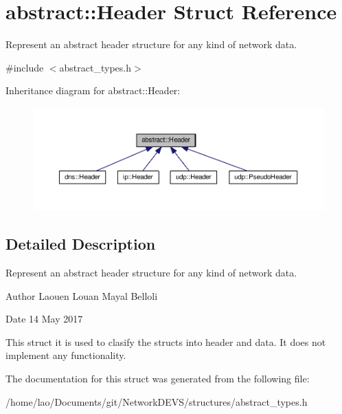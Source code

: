 \hypertarget{structabstract_1_1Header}{}\section{abstract\+:\+:Header Struct Reference}
\label{structabstract_1_1Header}


Represent an abstract header structure for any kind of network data.  




{\ttfamily \#include $<$abstract\+\_\+types.\+h$>$}



Inheritance diagram for abstract\+:\+:Header\+:\nopagebreak
\begin{figure}[H]
\begin{center}
\leavevmode
\includegraphics[width=350pt]{structabstract_1_1Header__inherit__graph}
\end{center}
\end{figure}


\subsection{Detailed Description}
Represent an abstract header structure for any kind of network data. 

\begin{DoxyAuthor}{Author}
Laouen Louan Mayal Belloli 
\end{DoxyAuthor}
\begin{DoxyDate}{Date}
14 May 2017
\end{DoxyDate}
This struct it is used to clasify the structs into header and data. It does not implement any functionality. 

The documentation for this struct was generated from the following file\+:\begin{DoxyCompactItemize}
\item 
/home/lao/\+Documents/git/\+Network\+D\+E\+V\+S/structures/abstract\+\_\+types.\+h\end{DoxyCompactItemize}
